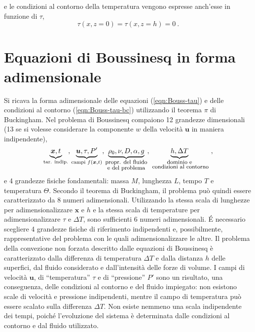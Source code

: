 \documentclass{article}
\begin{document}
e le condizioni al contorno della temperatura vengono espresse anch'esse in funzione di $\tau$,
\begin{equation}\label{eqn:Bouss-tau-bc}
    \tau(x,z=0) = \tau(x,z=h) = 0 \ .
\end{equation}

\section{Equazioni di Boussinesq in forma adimensionale}
Si ricava la forma adimensionale delle equazioni (\ref{eqn:Bouss-tau}) e delle condizioni al contorno (\ref{eqn:Bouss-tau-bc}) utilizzando il teorema $\pi$ di Buckingham. 
\newline
Nel problema di Boussinesq compaiono 12 grandezze dimensionali 
(13 se si volesse considerare la componente $w$ della velocità $\bm{u}$ in maniera indipendente),
\begin{equation}
    \underbrace{\bm{x}, t}_{\text{tar. indip.}}, 
    \underbrace{\bm{u}, \tau, P'}_{\text{campi } f(\bm{x},t)},
    \underbrace{\rho_0, \nu, D, \alpha, g}_{\substack{ \text{\footnotesize{propr. del fluido}} \\ \text{\footnotesize{e del problema}} } }, 
    \underbrace{h, \Delta T}_{\substack{ \text{\footnotesize{dominio e}} \\ \text{\footnotesize{ condizioni al contorno}} } } \ ,
\end{equation}
e 4 grandezze fisiche fondamentali: massa $M$, lunghezza $L$, tempo $T$ e temperatura $\Theta$.
Secondo il teorema di Buckingham, il problema può quindi essere caratterizzato da 8 numeri adimensionali. Utilizzando la stessa scala di lunghezze per adimensionalizzare $\bm{x}$ e $h$ e la stessa scala di temperature per adimensionalizzare $\tau$ e $\Delta T$, sono sufficienti 6 numeri adimensionali.
\newline
\'E necessario scegliere 4 grandezze fisiche di riferimento indipendenti e, possibilmente, rappresentative del problema con le quali adimensionalizzare le altre. Il problema della convezione non forzata  descritto dalle equazioni di Boussinesq è caratterizzato dalla differenza di temperatura $\Delta T$  e dalla distanza $h$ delle superfici, dal fluido considerato e dall'intensità delle forze di volume. I campi di velocità $\bm{u}$, di ``temperatura'' $\tau$ e di ``pressione'' $P'$ sono un risultato, una conseguenza, delle condizioni al contorno e del fluido impiegato: non esistono scale di velocità e pressione indipendenti, mentre il campo di temperatura può essere scalato sulla differenza $\Delta T$. Non esiste nemmeno una scala indipendente dei tempi, poiché l'evoluzione del sistema è determinata dalle condizioni al contorno e dal fluido utilizzato.
\end{document}
